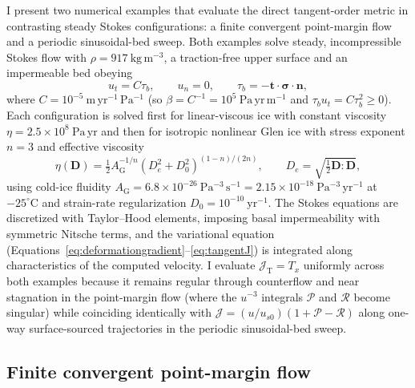 \documentclass[review]{igs}
\begin{document}
I present two numerical examples that evaluate the direct tangent-order metric in contrasting steady Stokes configurations: a finite convergent point-margin flow and a periodic sinusoidal-bed sweep. Both examples solve steady, incompressible Stokes flow with \(\rho=917~\mathrm{kg\,m^{-3}}\), a traction-free upper surface and an impermeable bed obeying
\begin{equation}
u_t=C\tau_b,
\qquad
u_n=0,
\qquad
\tau_b=-\bm{t}\mathbin{\cdot}\bm{\sigma}\mathbin{\cdot}\bm{n},
\label{eq:linearsliding}
\end{equation}
where \(C=10^{-5}~\mathrm{m\,yr^{-1}\,Pa^{-1}}\) (so \(\beta=C^{-1}=10^5~\mathrm{Pa\,yr\,m^{-1}}\) and \(\tau_b u_t=C\tau_b^2\geq0\)). Each configuration is solved first for linear-viscous ice with constant viscosity \(\eta=2.5\times10^8~\mathrm{Pa\,yr}\) and then for isotropic nonlinear Glen ice with stress exponent \(n=3\) and effective viscosity
\begin{equation}
\eta(\bm{D})=\tfrac12 A_{\mathrm{G}}^{-1/n}\left(D_e^2+D_0^2\right)^{(1-n)/(2n)},
\qquad
D_e=\sqrt{\tfrac12\bm{D}:\bm{D}},
\label{eq:glenrheology}
\end{equation}
using cold-ice fluidity \(A_{\mathrm{G}}=6.8\times10^{-26}~\mathrm{Pa^{-3}\,s^{-1}}=2.15\times10^{-18}~\mathrm{Pa^{-3}\,yr^{-1}}\) at \(-25^{\circ}\mathrm{C}\) \citep{CuffeyPaterson2010} and strain-rate regularization \(D_0=10^{-10}~\mathrm{yr^{-1}}\). The Stokes equations are discretized with Taylor--Hood elements, imposing basal impermeability with symmetric Nitsche terms, and the variational equation (Equations~\ref{eq:deformationgradient}--\ref{eq:tangentJ}) is integrated along characteristics of the computed velocity. I evaluate \(\mathcal{J}_{\mathrm{T}}=T_x\) uniformly across both examples because it remains regular through counterflow and near stagnation in the point-margin flow (where the \(u^{-3}\) integrals \(\mathcal{P}\) and \(\mathcal{R}\) become singular) while coinciding identically with \(\mathcal{J}=(u/u_{s0})(1+\mathcal{P}-\mathcal{R})\) along one-way surface-sourced trajectories in the periodic sinusoidal-bed sweep.

\subsection{Finite convergent point-margin flow}
\end{document}
